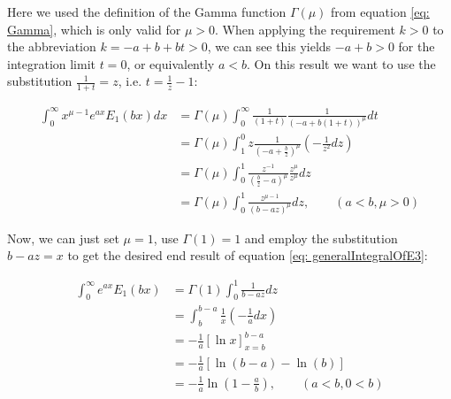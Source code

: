 \documentclass[bibliography=totocnumbered]{scrartcl}
\newcommand{\assume}[1][\text{MISSING PARAMETER}]{,\qquad\left(#1\right)}
\begin{document}
			Here we used the definition of the Gamma function $\Gamma\left(\mu\right)$ from equation \eqref{eq: Gamma}, which is only valid for $\mu>0$. When applying the requirement $k>0$ to the abbreviation $k=-a+b+bt>0$, we can see this yields $-a+b>0$ for the integration limit $t=0$, or equivalently $a<b$. On this result we want to use the substitution $\frac{1}{1+t}=z$, i.e. $t=\frac{1}{z}-1$:
			
			\begin{align}
			\int_{0}^{\infty}x^{\mu-1}e^{ax}E_1\left(bx\right)dx&=\Gamma\left(\mu\right)\int_{0}^{\infty}\frac{1}{\left(1+t\right)}\frac{1}{\left(-a+b\left(1+t\right)\right)^\mu}dt\\
			&=\Gamma\left(\mu\right)\int_{1}^{0}z\frac{1}{\left(-a+\frac{b}{z}\right)^{\mu}}\left(-\frac{1}{z^2}dz\right)\\
			&=\Gamma\left(\mu\right)\int_{0}^{1}\frac{z^{-1}}{\left(\frac{b}{z}-a\right)^{\mu}}\frac{z^{\mu}}{z^{\mu}}dz\\
			&=\Gamma\left(\mu\right)\int_{0}^{1}\frac{z^{\mu-1}}{\left(b-az\right)^{\mu}}dz\assume[a<b, \mu>0]
			\end{align}
			
			Now, we can just set $\mu=1$, use $\Gamma\left(1\right)=1$ and employ the substitution $b-az=x$ to get the desired end result of equation \eqref{eq: generalIntegralOfE3}:
			
			\begin{align}
			\int_{0}^{\infty}e^{ax}E_1\left(bx\right)&=\Gamma\left(1\right)\int_{0}^{1}\frac{1}{b-az}dz\\
			&=\int_{b}^{b-a}\frac{1}{x}\left(-\frac{1}{a}dx\right)\\
			&=-\frac{1}{a}\left[\ln{x}\right]^{b-a}_{x=b}\\
			&=-\frac{1}{a}\left[\ln{\left(b-a\right)}-\ln{\left(b\right)}\right]\\
			&=-\frac{1}{a}\ln{\left(1-\frac{a}{b}\right)}\assume[a<b, 0<b]
			\end{align}
\end{document}
